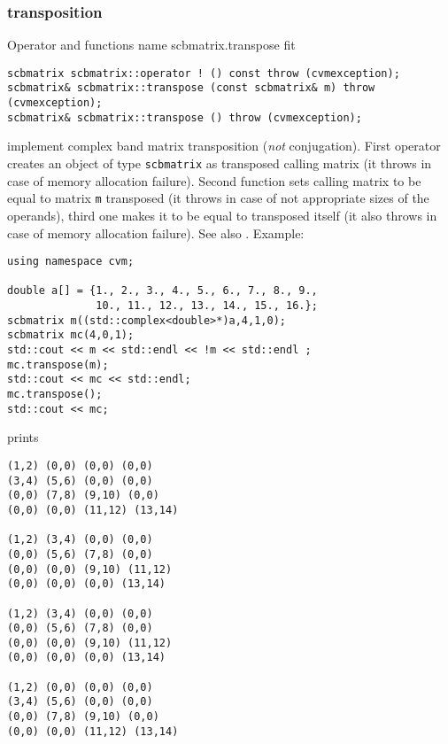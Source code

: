 \subsubsection{transposition}
Operator and functions%
\pdfdest name {scbmatrix.transpose} fit
\begin{verbatim}
scbmatrix scbmatrix::operator ! () const throw (cvmexception);
scbmatrix& scbmatrix::transpose (const scbmatrix& m) throw (cvmexception);
scbmatrix& scbmatrix::transpose () throw (cvmexception);
\end{verbatim}
implement complex band matrix transposition (\emph{not} conjugation).
First operator creates an object of type \verb"scbmatrix" as
 transposed calling matrix
(it throws  
in case of memory allocation failure). 
Second function sets  calling matrix to be equal to  matrix
\verb"m" transposed
(it throws  
in case of not appropriate sizes of the operands), 
third one makes it to be equal to
transposed itself (it also throws  
in case of memory allocation failure). 
See also .
Example:
\begin{Verbatim}
using namespace cvm;

double a[] = {1., 2., 3., 4., 5., 6., 7., 8., 9.,
              10., 11., 12., 13., 14., 15., 16.};
scbmatrix m((std::complex<double>*)a,4,1,0);
scbmatrix mc(4,0,1);
std::cout << m << std::endl << !m << std::endl ;
mc.transpose(m);
std::cout << mc << std::endl;
mc.transpose();
std::cout << mc;
\end{Verbatim}
prints
\begin{Verbatim}
(1,2) (0,0) (0,0) (0,0)
(3,4) (5,6) (0,0) (0,0)
(0,0) (7,8) (9,10) (0,0)
(0,0) (0,0) (11,12) (13,14)

(1,2) (3,4) (0,0) (0,0)
(0,0) (5,6) (7,8) (0,0)
(0,0) (0,0) (9,10) (11,12)
(0,0) (0,0) (0,0) (13,14)

(1,2) (3,4) (0,0) (0,0)
(0,0) (5,6) (7,8) (0,0)
(0,0) (0,0) (9,10) (11,12)
(0,0) (0,0) (0,0) (13,14)

(1,2) (0,0) (0,0) (0,0)
(3,4) (5,6) (0,0) (0,0)
(0,0) (7,8) (9,10) (0,0)
(0,0) (0,0) (11,12) (13,14)
\end{Verbatim}
\newpage









